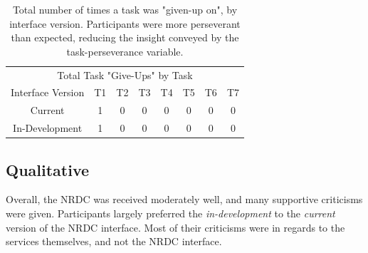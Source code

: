 \documentclass{article}
\begin{document}
\begin{table}[h]
    \centering
    \begin{tabular}{| c | c | c | c | c | c | c | c |}
    \hline
    \multicolumn{8}{|c|}{Total Task "Give-Ups" by Task} \\
    Interface Version & T1 & T2 & T3 & T4 & T5 & T6 & T7 \\
    \hline
    \hline
    Current           &  1 &  0 &  0 &  0 &  0 &  0 &  0 \\
    \hline
    In-Development    &  1 &  0 &  0 &  0 &  0 &  0 &  0 \\
    \hline
    \end{tabular}
    
    \caption{Total number of times a task was "given-up on", by interface version. Participants were more perseverant than expected, reducing the insight conveyed by the task-perseverance variable.}
    \label{tab:give_ups}
\end{table}

%
\subsection{Qualitative}

Overall, the NRDC was received moderately well, and many supportive criticisms were given. Participants largely preferred the \emph{in-development} to the \emph{current} version of the NRDC interface. Most of their criticisms were in regards to the services themselves, and not the NRDC interface.
\end{document}
